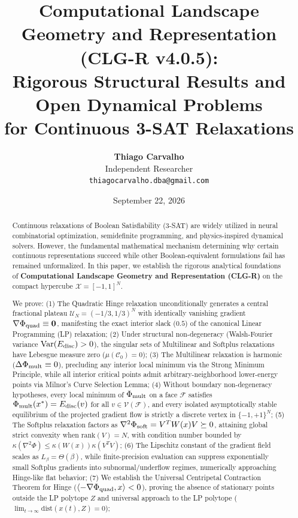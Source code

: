 \documentclass[11pt,a4paper]{article}
\title{\textbf{Computational Landscape Geometry and Representation (CLG-R v4.0.5):\\
Rigorous Structural Results and Open Dynamical Problems\\
for Continuous 3-SAT Relaxations}}
\author{
    \textbf{Thiago Carvalho}\\
    Independent Researcher\\
    \texttt{thiagocarvalho.dba@gmail.com}
}
\date{September 22, 2026}
\begin{document}
\maketitle

\begin{abstract}
Continuous relaxations of Boolean Satisfiability (3-SAT) are widely utilized in neural combinatorial optimization, semidefinite programming, and physics-inspired dynamical solvers. However, the fundamental mathematical mechanism determining why certain continuous representations succeed while other Boolean-equivalent formulations fail has remained unformalized. In this paper, we establish the rigorous analytical foundations of \textbf{Computational Landscape Geometry and Representation (CLG-R)} on the compact hypercube $\mathcal{X} = [-1, 1]^N$. 

We prove: 
(1) The Quadratic Hinge relaxation unconditionally generates a central fractional plateau $\mathcal{U}_N = (-1/3, 1/3)^N$ with identically vanishing gradient $\nabla \Phi_{\rm quad} \equiv \mathbf{0}$, manifesting the exact interior slack ($0.5$) of the canonical Linear Programming (LP) relaxation;
(2) Under structural non-degeneracy (Walsh-Fourier variance $\text{Var}(E_{\rm disc}) > 0$), the singular sets of Multilinear and Softplus relaxations have Lebesgue measure zero ($\mu(\mathcal{C}_0) = 0$);
(3) The Multilinear relaxation is harmonic ($\Delta \Phi_{\rm mult} \equiv 0$), precluding any interior local minimum via the Strong Minimum Principle, while all interior critical points admit arbitrary-neighborhood lower-energy points via Milnor's Curve Selection Lemma;
(4) Without boundary non-degeneracy hypotheses, every local minimum of $\Phi_{\rm mult}$ on a face $\mathcal{F}$ satisfies $\Phi_{\rm mult}(x^*) = E_{\rm disc}(v)$ for all $v \in \mathcal{V}(\mathcal{F})$, and every isolated asymptotically stable equilibrium of the projected gradient flow is strictly a discrete vertex in $\{-1, +1\}^N$;
(5) The Softplus relaxation factors as $\nabla^2 \Phi_{\rm soft} = V^T W(x) V \succeq 0$, attaining global strict convexity when $\text{rank}(V) = N$, with condition number bounded by $\kappa(\nabla^2 \Phi) \le \kappa(W(x)) \kappa(V^T V)$;
(6) The Lipschitz constant of the gradient field scales as $L_\beta = \Theta(\beta)$, while finite-precision evaluation can suppress exponentially small Softplus gradients into subnormal/underflow regimes, numerically approaching Hinge-like flat behavior;
(7) We establish the Universal Centripetal Contraction Theorem for Hinge ($\langle -\nabla \Phi_{\rm quad}, x \rangle < 0$), proving the absence of stationary points outside the LP polytope $Z$ and universal approach to the LP polytope ($\lim_{t \to \infty} \text{dist}(x(t), Z) = 0$);

\end{abstract}
\end{document}
